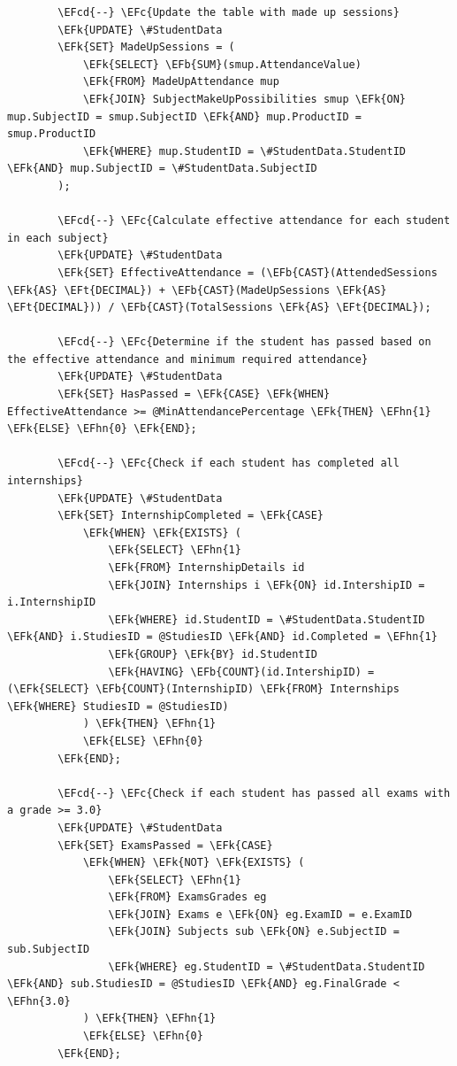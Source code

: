 \documentclass[11pt]{article}
\newcommand{\EFc}[1]{\textcolor{EFc}{\textit{#1}}} %
\newcommand{\EFcd}[1]{\textcolor{EFcd}{\textit{#1}}} %
\newcommand{\EFk}[1]{\textcolor{EFk}{\textbf{#1}}} %
\newcommand{\EFb}[1]{\textcolor{EFb}{\textbf{#1}}} %
\newcommand{\EFt}[1]{\textcolor{EFt}{\textbf{#1}}} %
\newcommand{\EFhn}[1]{\textcolor{EFhn}{#1}} %
\begin{document}
\begin{Code}
\begin{Verbatim}
        \EFcd{--} \EFc{Update the table with made up sessions}
        \EFk{UPDATE} \#StudentData
        \EFk{SET} MadeUpSessions = (
            \EFk{SELECT} \EFb{SUM}(smup.AttendanceValue)
            \EFk{FROM} MadeUpAttendance mup
            \EFk{JOIN} SubjectMakeUpPossibilities smup \EFk{ON} mup.SubjectID = smup.SubjectID \EFk{AND} mup.ProductID = smup.ProductID
            \EFk{WHERE} mup.StudentID = \#StudentData.StudentID \EFk{AND} mup.SubjectID = \#StudentData.SubjectID
        );

        \EFcd{--} \EFc{Calculate effective attendance for each student in each subject}
        \EFk{UPDATE} \#StudentData
        \EFk{SET} EffectiveAttendance = (\EFb{CAST}(AttendedSessions \EFk{AS} \EFt{DECIMAL}) + \EFb{CAST}(MadeUpSessions \EFk{AS} \EFt{DECIMAL})) / \EFb{CAST}(TotalSessions \EFk{AS} \EFt{DECIMAL});

        \EFcd{--} \EFc{Determine if the student has passed based on the effective attendance and minimum required attendance}
        \EFk{UPDATE} \#StudentData
        \EFk{SET} HasPassed = \EFk{CASE} \EFk{WHEN} EffectiveAttendance >= @MinAttendancePercentage \EFk{THEN} \EFhn{1} \EFk{ELSE} \EFhn{0} \EFk{END};

        \EFcd{--} \EFc{Check if each student has completed all internships}
        \EFk{UPDATE} \#StudentData
        \EFk{SET} InternshipCompleted = \EFk{CASE}
            \EFk{WHEN} \EFk{EXISTS} (
                \EFk{SELECT} \EFhn{1}
                \EFk{FROM} InternshipDetails id
                \EFk{JOIN} Internships i \EFk{ON} id.IntershipID = i.InternshipID
                \EFk{WHERE} id.StudentID = \#StudentData.StudentID \EFk{AND} i.StudiesID = @StudiesID \EFk{AND} id.Completed = \EFhn{1}
                \EFk{GROUP} \EFk{BY} id.StudentID
                \EFk{HAVING} \EFb{COUNT}(id.IntershipID) = (\EFk{SELECT} \EFb{COUNT}(InternshipID) \EFk{FROM} Internships \EFk{WHERE} StudiesID = @StudiesID)
            ) \EFk{THEN} \EFhn{1}
            \EFk{ELSE} \EFhn{0}
        \EFk{END};

        \EFcd{--} \EFc{Check if each student has passed all exams with a grade >= 3.0}
        \EFk{UPDATE} \#StudentData
        \EFk{SET} ExamsPassed = \EFk{CASE}
            \EFk{WHEN} \EFk{NOT} \EFk{EXISTS} (
                \EFk{SELECT} \EFhn{1}
                \EFk{FROM} ExamsGrades eg
                \EFk{JOIN} Exams e \EFk{ON} eg.ExamID = e.ExamID
                \EFk{JOIN} Subjects sub \EFk{ON} e.SubjectID = sub.SubjectID
                \EFk{WHERE} eg.StudentID = \#StudentData.StudentID \EFk{AND} sub.StudiesID = @StudiesID \EFk{AND} eg.FinalGrade < \EFhn{3.0}
            ) \EFk{THEN} \EFhn{1}
            \EFk{ELSE} \EFhn{0}
        \EFk{END};


\end{Verbatim}
\end{Code}
\end{document}
